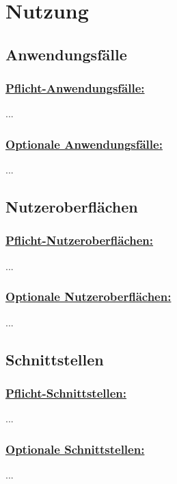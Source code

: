 %
%


\chapter{Nutzung}
\label{Nutzung}



\section{Anwendungsfälle}

\subsection*{\underline{Pflicht-Anwendungsfälle:}}

...
\\


\subsection*{\underline{Optionale Anwendungsfälle:}}

...
\\


\section{Nutzeroberflächen}

\subsection*{\underline{Pflicht-Nutzeroberflächen:}}

...
\\


\subsection*{\underline{Optionale Nutzeroberflächen:}}

...
\\


\section{Schnittstellen}

\subsection*{\underline{Pflicht-Schnittstellen:}}

...
\\


\subsection*{\underline{Optionale Schnittstellen:}}

...
\\


